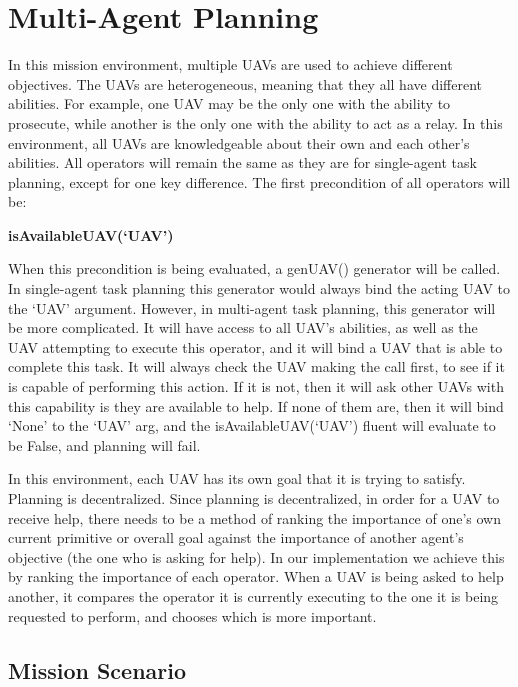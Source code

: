 \documentclass[12pt]{article}
\begin{document}
\section{Multi-Agent Planning}

In this mission environment, multiple UAVs are used to achieve different objectives. The UAVs are heterogeneous, meaning that they all have different abilities. For example, one UAV may be the only one with the ability to prosecute, while another is the only one with the ability to act as a relay. In this environment, all UAVs are knowledgeable about their own and each other's abilities. All operators will remain the same as they are for single-agent task planning, except for one key difference. The first precondition of all operators will be:
\begin{center}
\textbf{isAvailableUAV(`UAV')}
\end{center}

When this precondition is being evaluated, a genUAV() generator will be called. In single-agent task planning this generator would always bind the acting UAV to the `UAV' argument. However, in multi-agent task planning, this generator will be more complicated. It will have access to all UAV's abilities, as well as the UAV attempting to execute this operator, and it will bind a UAV that is able to complete this task. It will always check the UAV making the call first, to see if it is capable of performing this action. If it is not, then it will ask other UAVs with this capability is they are available to help. If none of them are, then it will bind `None' to the `UAV' arg, and the isAvailableUAV(`UAV') fluent will evaluate to be False, and planning will fail.

In this environment, each UAV has its own goal that it is trying to satisfy. Planning is decentralized. Since planning is decentralized, in order for a UAV to receive help, there needs to be a method of ranking the importance of one's own current primitive or overall goal against the importance of another agent's objective (the one who is asking for help). In our implementation we achieve this by ranking the importance of each operator. When a UAV is being asked to help another, it compares the operator it is currently executing to the one it is being requested to perform, and chooses which is more important.

\subsection{Mission Scenario}
\end{document}
